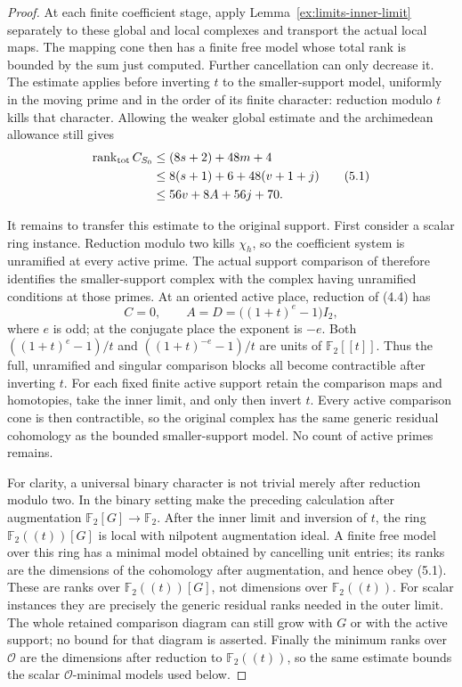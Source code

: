 \documentclass[11pt]{article}
\theoremstyle{definition}
\theoremstyle{remark}
\newcommand{\F}{\mathbb F}
\providecommand{\mathscr}[1]{\mathcal{#1}}
\begin{document}
\begin{proof}
At each finite coefficient stage, apply
Lemma~\ref{ex:limits-inner-limit} separately to these global and
local complexes and transport the actual local maps. The mapping
cone then has a finite free model whose total rank is bounded by
the sum just computed. Further cancellation can only decrease it.
The estimate applies before inverting $t$ to the smaller-support
model, uniformly in the moving prime and in the order of its
finite character: reduction modulo $t$ kills that character.
Allowing the weaker global estimate and the archimedean allowance
still gives
\[
 \begin{split}
 \operatorname{rank}_{\rm tot} C_{S_0}
 &\le(8s+2)+48m+4\\
 &\le8(s+1)+6+48(v+1+j)\\
 &\le56v+8A+56j+70.
 \end{split}\tag{5.1}
\]

It remains to transfer this estimate to the original support.
First consider a scalar ring instance. Reduction modulo two kills
$\chi_h$, so the coefficient system is unramified at every active
prime. The actual support comparison of
\cite[Proposition 7.8.8(ii)]{nekovar} therefore identifies the
smaller-support complex with the complex having unramified
conditions at those primes. At an oriented active place, reduction
of (4.4) has
\[
 C=0,\qquad A=D=\big((1+t)^e-1\big)I_2,
\]
where $e$ is odd; at the conjugate place the exponent is $-e$.
Both $((1+t)^e-1)/t$ and $((1+t)^{-e}-1)/t$ are units of
$\F_2[[t]]$. Thus the full, unramified and singular comparison
blocks all become contractible after inverting $t$. For each fixed
finite active support retain the comparison maps and homotopies,
take the inner limit, and only then invert $t$. Every active
comparison cone is then contractible, so the original complex has
the same generic residual cohomology as the bounded smaller-support
model. No count of active primes remains.

For clarity, a universal binary character is not trivial merely
after reduction modulo two. In the binary setting make the preceding
calculation after augmentation $\F_2[G]\to\F_2$. After the inner
limit and inversion of $t$, the ring $\F_2((t))[G]$ is local with
nilpotent augmentation ideal. A finite free model over this ring
has a minimal model obtained by cancelling unit entries; its ranks
are the dimensions of the cohomology after augmentation, and hence
obey (5.1). These are ranks over $\F_2((t))[G]$, not dimensions
over $\F_2((t))$. For scalar instances they are precisely the
generic residual ranks needed in the outer limit. The whole retained
comparison diagram can still grow with $G$ or with the active
support; no bound for that diagram is asserted. Finally the minimum
ranks over $\mathscr O$ are the dimensions after reduction to
$\F_2((t))$, so the same estimate bounds the scalar
$\mathscr O$-minimal models used below.
\end{proof}
\end{document}
